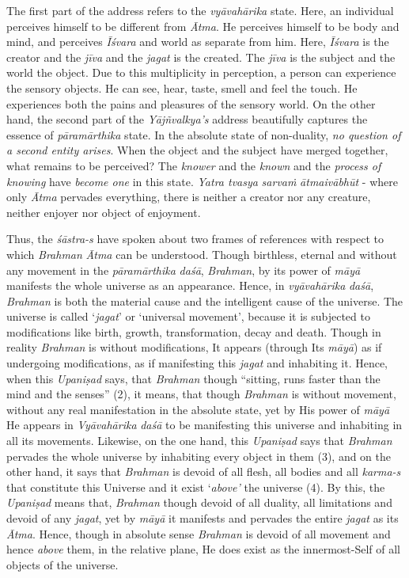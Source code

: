 The first part of the address refers to the \emph{vyāvahārika} state. Here, an individual perceives himself to be different from \emph{Ātma}. He perceives himself to be body and mind, and perceives \emph{Īśvara} and world as separate from him. Here, \emph{Īśvara} is the creator and the \emph{jīva} and the \emph{jagat} is the created. The \emph{jīva} is the subject and the world the object. Due to this multiplicity in perception, a person can experience the sensory objects. He can see, hear, taste, smell and feel the touch. He experiences both the pains and pleasures of the sensory world. On the other hand, the second part of the \emph{Yājñvalkya's} address beautifully captures the essence of \emph{pāramārthika} state. In the absolute state of non-duality, \emph{no question of a second entity arises}. When the object and the subject have merged together, what remains to be perceived? The \emph{knower} and the \emph{known} and the \emph{process of knowing} have \emph{become one} in this state. \emph{Yatra tvasya} \emph{sarvaṁ} \emph{ātmaivābhūt} - where only \emph{Ātma} pervades everything, there is neither a creator nor any creature, neither enjoyer nor object of enjoyment.

Thus, the \emph{śāstra-s} have spoken about two frames of references with respect to which \emph{Brahman}  \emph{Ātma} can be understood. Though birthless, eternal and without any movement in the \emph{pāramārthika} \emph{daśā}, \emph{Brahman}, by its power of \emph{māyā} manifests the whole universe as an appearance. Hence, in \emph{vyāvahārika} \emph{daśā}, \emph{Brahman} is both the material cause and the intelligent cause of the universe. The universe is called `\emph{jagat}' or `universal movement', because it is subjected to modifications like birth, growth, transformation, decay and death. Though in reality \emph{Brahman} is without modifications, It appears (through Its \emph{māyā}) as if undergoing modifications, as if manifesting this \emph{jagat} and inhabiting it. Hence, when this \emph{Upaniṣad} says, that \emph{Brahman} though ``sitting, runs faster than the mind and the senses'' (2), it means, that though \emph{Brahman} is without movement, without any real manifestation in the absolute state, yet by His power of \emph{māyā} He appears in \emph{Vyāvahārika} \emph{daśā} to be manifesting this universe and inhabiting in all its movements. Likewise, on the one hand, this \emph{Upaniṣad} says that \emph{Brahman} pervades the whole universe by inhabiting every object in them (3), and on the other hand, it says that \emph{Brahman} is devoid of all flesh, all bodies and all \emph{karma-s} that constitute this Universe and it exist `\emph{above'} the universe (4). By this, the \emph{Upaniṣad} means that, \emph{Brahman} though devoid of all duality, all limitations and devoid of any \emph{jagat}, yet by \emph{māyā} it manifests and pervades the entire \emph{jagat} as its \emph{Ātma}. Hence, though in absolute sense \emph{Brahman} is devoid of all movement and hence \emph{above} them, in the relative plane, He does exist as the innermost-Self of all objects of the universe.


